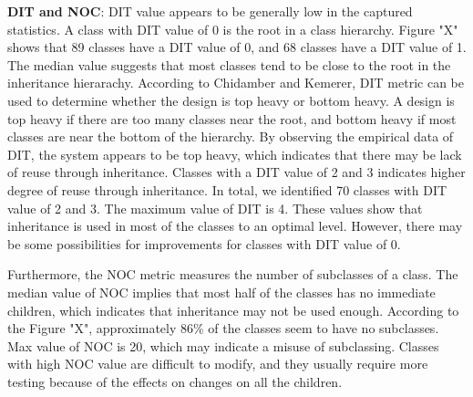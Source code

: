 \textbf{DIT and NOC}: DIT value appears to be generally low in the captured statistics. A class with DIT value of 0 is the root in a class hierarchy. Figure "X" shows that 89 classes have a DIT value of 0, and 68 classes have a DIT value of 1. The median value suggests that most classes tend to be close to the root in the inheritance hierarachy. According to Chidamber and Kemerer\cite{chidamber1994metrics}, DIT metric can be used to determine whether the design is top heavy or bottom heavy. A design is top heavy if there are too many classes near the root, and bottom heavy if most classes are near the bottom of the hierarchy. By observing the empirical data of DIT, the system appears to be top heavy, which indicates that there may be lack of reuse through inheritance. Classes with a DIT value of 2 and 3 indicates higher degree of reuse through inheritance. In total, we identified 70 classes with DIT value of 2 and 3. The maximum value of DIT is 4. These values show that inheritance is used in most of the classes to an optimal level. However, there may be some possibilities for improvements for classes with DIT value of 0. 

Furthermore, the NOC metric measures the number of subclasses of a class. The median value of NOC implies that most half of the classes has no immediate children, which indicates that inheritance may not be used enough. According to the Figure "X", approximately 86\% of the classes seem to have no subclasses. Max value of NOC is 20, which may indicate a misuse of subclassing. Classes with high NOC value are difficult to modify, and they usually require more testing because of the effects on changes on all the children. 

